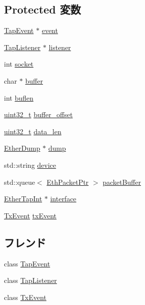 \subsection*{Protected 変数}
\begin{DoxyCompactItemize}
\item 
\hyperlink{classTapEvent}{TapEvent} $\ast$ \hyperlink{classEtherTap_afe2f4b98936d4a983d2fdf5a87b0a35a}{event}
\item 
\hyperlink{classTapListener}{TapListener} $\ast$ \hyperlink{classEtherTap_a63f477b36e686c92354d58f1c89733e4}{listener}
\item 
int \hyperlink{classEtherTap_a3666576f6b88007cc7b8f26c7da596c8}{socket}
\item 
char $\ast$ \hyperlink{classEtherTap_aff2566f4c366b48d73479bef43ee4d2e}{buffer}
\item 
int \hyperlink{classEtherTap_a20cc6ed09a3d84d74f09f49179a2ccc8}{buflen}
\item 
\hyperlink{Type_8hh_a435d1572bf3f880d55459d9805097f62}{uint32\_\-t} \hyperlink{classEtherTap_a142fa22642f8476dd064a014504dba4c}{buffer\_\-offset}
\item 
\hyperlink{Type_8hh_a435d1572bf3f880d55459d9805097f62}{uint32\_\-t} \hyperlink{classEtherTap_a231d88a2076c53df88d8ffd7eb1c50ec}{data\_\-len}
\item 
\hyperlink{classEtherDump}{EtherDump} $\ast$ \hyperlink{classEtherTap_ad5a0f1baca11c9598fdb6996bd03ac8c}{dump}
\item 
std::string \hyperlink{classEtherTap_a5d346a4e5fa3df29a43d150d99c8a02a}{device}
\item 
std::queue$<$ \hyperlink{classRefCountingPtr}{EthPacketPtr} $>$ \hyperlink{classEtherTap_a64872f3fc85b752e1d265c01ae4efc14}{packetBuffer}
\item 
\hyperlink{classEtherTapInt}{EtherTapInt} $\ast$ \hyperlink{classEtherTap_a30919c26a7c1ead7f6051857f09166b9}{interface}
\item 
\hyperlink{classEtherTap_1_1TxEvent}{TxEvent} \hyperlink{classEtherTap_a324fed072a29716c20a98a82927bd2a2}{txEvent}
\end{DoxyCompactItemize}
\subsection*{フレンド}
\begin{DoxyCompactItemize}
\item 
class \hyperlink{classEtherTap_aba9fb7c9bd6302c5f68dfabdc49d14ac}{TapEvent}
\item 
class \hyperlink{classEtherTap_a534464fc09d99a2448acae9c7e03ad40}{TapListener}
\item 
class \hyperlink{classEtherTap_aa5fe1d38b426de2d1186b071417eb76e}{TxEvent}
\end{DoxyCompactItemize}


